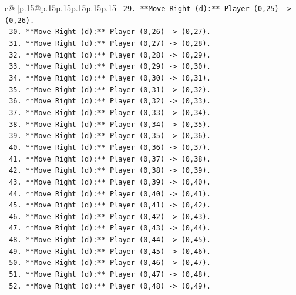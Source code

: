 \documentclass{article}
\begin{document}
{\begin{supertabular}{c@{$\;$}|p{.15\linewidth}@{}p{.15\linewidth}p{.15\linewidth}p{.15\linewidth}p{.15\linewidth}p{.15\linewidth}}
{{{\texttt{        29. **Move Right (d):** Player (0,25) {-}> (0,26).} \\
\texttt{        30. **Move Right (d):** Player (0,26) {-}> (0,27).} \\
\texttt{        31. **Move Right (d):** Player (0,27) {-}> (0,28).} \\
\texttt{        32. **Move Right (d):** Player (0,28) {-}> (0,29).} \\
\texttt{        33. **Move Right (d):** Player (0,29) {-}> (0,30).} \\
\texttt{        34. **Move Right (d):** Player (0,30) {-}> (0,31).} \\
\texttt{        35. **Move Right (d):** Player (0,31) {-}> (0,32).} \\
\texttt{        36. **Move Right (d):** Player (0,32) {-}> (0,33).} \\
\texttt{        37. **Move Right (d):** Player (0,33) {-}> (0,34).} \\
\texttt{        38. **Move Right (d):** Player (0,34) {-}> (0,35).} \\
\texttt{        39. **Move Right (d):** Player (0,35) {-}> (0,36).} \\
\texttt{        40. **Move Right (d):** Player (0,36) {-}> (0,37).} \\
\texttt{        41. **Move Right (d):** Player (0,37) {-}> (0,38).} \\
\texttt{        42. **Move Right (d):** Player (0,38) {-}> (0,39).} \\
\texttt{        43. **Move Right (d):** Player (0,39) {-}> (0,40).} \\
\texttt{        44. **Move Right (d):** Player (0,40) {-}> (0,41).} \\
\texttt{        45. **Move Right (d):** Player (0,41) {-}> (0,42).} \\
\texttt{        46. **Move Right (d):** Player (0,42) {-}> (0,43).} \\
\texttt{        47. **Move Right (d):** Player (0,43) {-}> (0,44).} \\
\texttt{        48. **Move Right (d):** Player (0,44) {-}> (0,45).} \\
\texttt{        49. **Move Right (d):** Player (0,45) {-}> (0,46).} \\
\texttt{        50. **Move Right (d):** Player (0,46) {-}> (0,47).} \\
\texttt{        51. **Move Right (d):** Player (0,47) {-}> (0,48).} \\
\texttt{        52. **Move Right (d):** Player (0,48) {-}> (0,49).} \\
}}}
\end{supertabular}}
\end{document}
